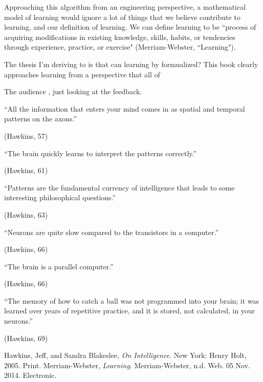 \documentclass[11pt, oneside]{article}
\begin{document}
\par Approaching this algorithm from an engineering perspective, a mathematical model of learning would ignore a lot of things that we believe contribute to learning, and our definition of learning. We can define learning to be ``process of acquiring modifications in existing knowledge, skills, habits, or tendencies through experience, practice, or exercise" (Merriam-Webster, ``Learning"). 

\par The thesis I'm deriving to is that can learning by formualized? This book clearly approaches learning from a perspective that all of 

\par The audience , just looking at the feedback.

\epigraph{``All the information that enters your mind comes in as spatial and temporal patterns on the axons.''}{(Hawkins, 57)} 

\epigraph{``The brain quickly learns to interpret the patterns correctly.''}{(Hawkins, 61)} 

\epigraph{``Patterns are the fundamental currency of intelligence that leads to some interesting philosophical questions.''}{(Hawkins, 63)} 

\epigraph{``Neurons are quite slow compared to the transistors in a computer.''}{(Hawkins, 66)} 

\epigraph{``The brain is a parallel computer.''}{(Hawkins, 66)} 

\epigraph{``The memory of how to catch a ball was not programmed into your brain; it was learned over years of repetitive practice, and it is stored, not calculated, in your neurons.''}{(Hawkins, 69)} 


\begin{thebibliography}{9}
  Hawkins, Jeff, and Sandra Blakeslee,
  \emph{On Intelligence}.
  New York: Henry Holt, 2005.
  Print.
  Merriam-Webster,
  \emph{Learning}.
  Merriam-Webster, n.d. Web. 05 Nov. 2014.
  Electronic.
\end{thebibliography}
\end{document}
